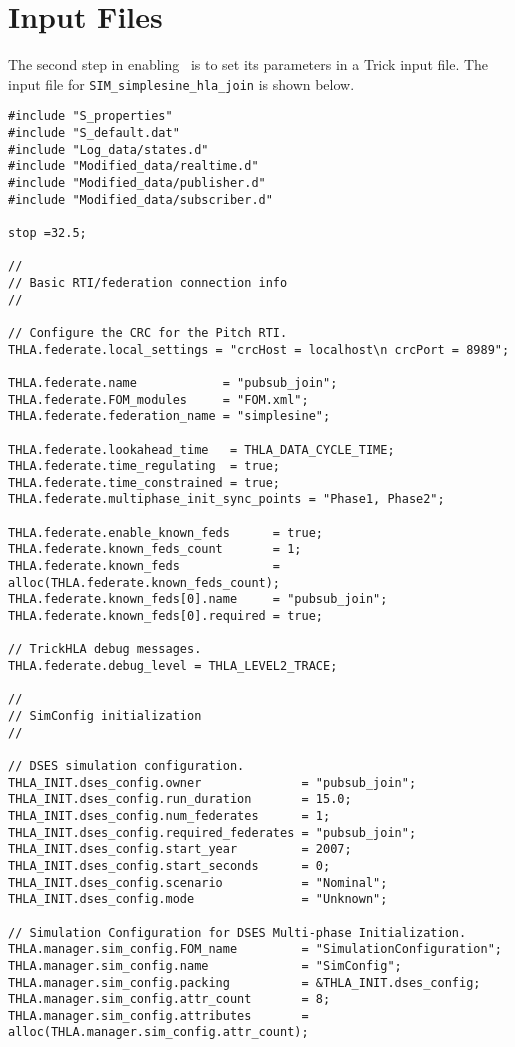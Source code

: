 \section{Input Files}

The second step in enabling \TrickHLA\ is to set its parameters in
a Trick input file.
The input file for {\tt SIM\_simplesine\_hla\_join} is shown below.

\begin{lstlisting}[caption={{\tt SIM\_simplesine\_hla\_join} input file},label={list:SIM-simplesine-hla-join-input}]
#include "S_properties"
#include "S_default.dat"
#include "Log_data/states.d"
#include "Modified_data/realtime.d"
#include "Modified_data/publisher.d"
#include "Modified_data/subscriber.d"

stop =32.5;

//
// Basic RTI/federation connection info
//

// Configure the CRC for the Pitch RTI.
THLA.federate.local_settings = "crcHost = localhost\n crcPort = 8989";

THLA.federate.name            = "pubsub_join";
THLA.federate.FOM_modules     = "FOM.xml";
THLA.federate.federation_name = "simplesine";

THLA.federate.lookahead_time   = THLA_DATA_CYCLE_TIME;
THLA.federate.time_regulating  = true;
THLA.federate.time_constrained = true;
THLA.federate.multiphase_init_sync_points = "Phase1, Phase2";

THLA.federate.enable_known_feds      = true;
THLA.federate.known_feds_count       = 1;
THLA.federate.known_feds             = alloc(THLA.federate.known_feds_count);
THLA.federate.known_feds[0].name     = "pubsub_join";
THLA.federate.known_feds[0].required = true;

// TrickHLA debug messages.
THLA.federate.debug_level = THLA_LEVEL2_TRACE;

//
// SimConfig initialization
//

// DSES simulation configuration.
THLA_INIT.dses_config.owner              = "pubsub_join";
THLA_INIT.dses_config.run_duration       = 15.0;
THLA_INIT.dses_config.num_federates      = 1;
THLA_INIT.dses_config.required_federates = "pubsub_join";
THLA_INIT.dses_config.start_year         = 2007;
THLA_INIT.dses_config.start_seconds      = 0;
THLA_INIT.dses_config.scenario           = "Nominal";
THLA_INIT.dses_config.mode               = "Unknown";

// Simulation Configuration for DSES Multi-phase Initialization.
THLA.manager.sim_config.FOM_name         = "SimulationConfiguration";
THLA.manager.sim_config.name             = "SimConfig";
THLA.manager.sim_config.packing          = &THLA_INIT.dses_config;
THLA.manager.sim_config.attr_count       = 8;
THLA.manager.sim_config.attributes       = alloc(THLA.manager.sim_config.attr_count);


\end{lstlisting}
